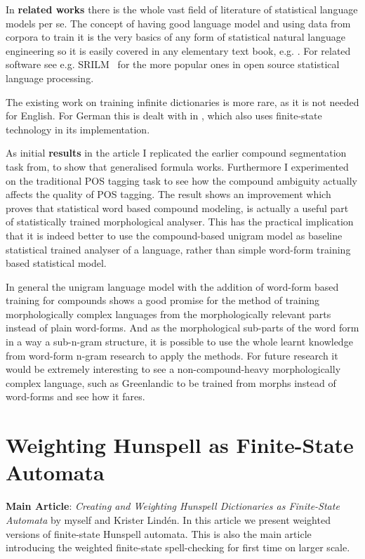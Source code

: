 \documentclass[officiallayout]{unihelcompling}
\begin{document}
In \textbf{related works} there is the whole vast field of literature of
statistical language models per se. The concept of having good language model
and using data from corpora to train it is the very basics of any form of
statistical natural language engineering so it is easily covered in any
elementary text book, e.g. . For related software
see e.g.  SRILM~\citep{stolcke2002srilm} for the more popular ones in open
source statistical language processing.

The existing work on training infinite dictionaries is more rare, as it is not
needed for English. For German this is dealt with in
\citep{schiller2006german}, which also uses finite-state technology in its
implementation.

As initial \textbf{results} in the article I replicated the earlier compound
segmentation task from, to show that generalised formula works.
Furthermore I experimented on the traditional POS tagging task to see how the
compound ambiguity actually affects the quality of POS tagging. The result
shows an improvement which proves that statistical word based compound
modeling, is actually a useful part of statistically trained morphological
analyser. This has the practical implication that it is indeed better to
use the compound-based unigram model as baseline statistical trained analyser
of a language, rather than simple word-form training based statistical model.

In general the unigram language model with the addition of word-form based
training for compounds shows a good promise for the method of training
morphologically complex languages from the morphologically relevant parts
instead of plain word-forms. And as the morphological sub-parts of the word
form in a way a sub-n-gram structure, it is possible to use the whole learnt
knowledge from word-form n-gram research to apply the methods. For future
research it would be extremely interesting to see a non-compound-heavy
morphologically complex language, such as Greenlandic to be trained from morphs
instead of word-forms and see how it fares.

\section{Weighting Hunspell as Finite-State Automata}
\label{sec:hunspell-training}

\textbf{Main Article}: \emph{Creating and Weighting Hunspell Dictionaries as Finite-State Automata} by myself and Krister Lindén. In this article we present
weighted versions of finite-state Hunspell automata. This is also the main
article introducing the weighted finite-state spell-checking for first time
on larger scale.
\end{document}
